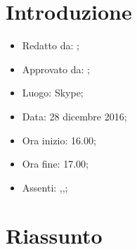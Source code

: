 \section{Introduzione}

	\begin{itemize}
		\item Redatto da: ;
		\item Approvato da: \AS;
		\item Luogo: Skype;
		\item Data: 28 dicembre 2016;
		\item Ora inizio: 16.00;
		\item Ora fine: 17.00;
		\item Assenti: \NS,\DS,\DAN;		
	\end{itemize}

\section{Riassunto}
